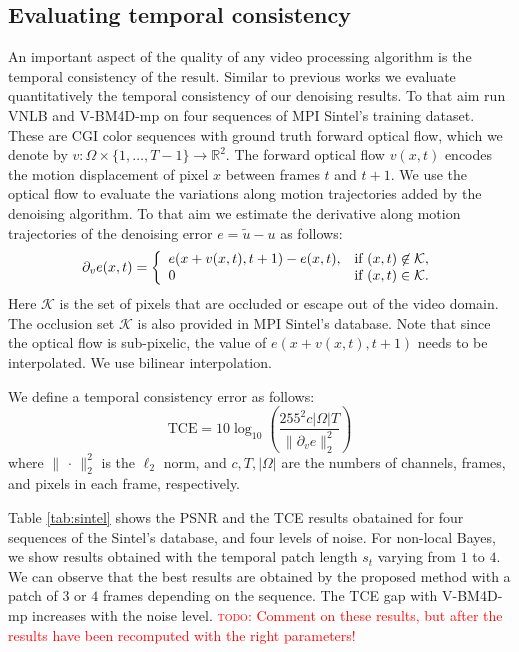 \documentclass[10pt, journal, twocolumn, final, a4paper]{IEEEtran}
\newcommand{\todo}[1]{\textcolor{red}{\noindent\textsc{todo}: #1}}
\begin{document}
\subsection{Evaluating temporal consistency}

An important aspect of the quality of any video processing algorithm is the 
temporal consistency of the result. Similar to previous works \cite{Liu2010, Sutour2014}
we evaluate quantitatively the temporal consistency of our denoising results.
To that aim run VNLB and V-BM4D-mp on four sequences of MPI Sintel's training
dataset. These are CGI color sequences with ground truth forward optical flow, which we
denote by $v:\Omega\times\{1,\dots,T-1\}\rightarrow \mathds R^2$. 
The forward optical flow $v(x,t)$ encodes the motion displacement of pixel $x$
between frames $t$ and $t +1$.
We use the optical flow to evaluate the variations along motion trajectories
added by the denoising algorithm. To that aim we estimate the derivative along
motion trajectories of the denoising error $e = \widetilde u - u$ as follows:
\[\partial_v e(x,t) =
\left\{
\begin{array}{l l}
	e(x + v(x,t), t+1) - e(x,t), & \text{if } (x,t)\not\in \mathcal{K},\\
	0 & \text{if } (x,t)\in \mathcal{K}.
\end{array}
\right.\]
Here $\mathcal K$ is the set of pixels that are occluded or escape out of the video
domain. The occlusion set $\mathcal K$ is also provided in MPI Sintel's database.
Note that since the optical flow is sub-pixelic, the value of $e(x + v(x,t),t+1)$
needs to be interpolated. We use bilinear interpolation.

We define a temporal consistency error as follows:
\[\text{TCE} = 10 \log_{10}\left(\frac{255^2 c|\Omega|T}{\|\partial_v e\|_2^2}\right)\]
where $\|\,\cdot\,\|_2^2$ is the $\ell_2$ norm, and $c, T, |\Omega|$ are the numbers
of channels, frames, and pixels in each frame, respectively.

Table \ref{tab:sintel} shows the PSNR and the TCE results obatained for four sequences of the
Sintel's database, and four levels of noise. For non-local Bayes, we show results obtained with 
the temporal patch length $s_t$ varying from $1$ to $4$. We can observe that the best results
are obtained by the proposed method with a patch of $3$ or $4$ frames depending
on the sequence. The TCE gap with V-BM4D-mp increases with the noise level. 
\todo{Comment on these results, but after the results have been recomputed with the right parameters!}
\end{document}
